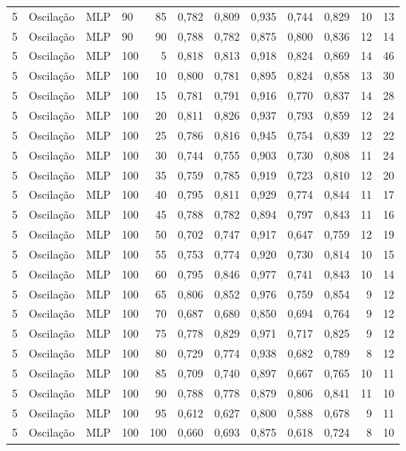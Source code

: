 \begin{longtable}{ccclrrrrrrrr}
5 & Oscilação & MLP & 90 & 85 & 0,782 & 0,809 & 0,935 & 0,744 & 0,829 & 10 & 13 \\
5 & Oscilação & MLP & 90 & 90 & 0,788 & 0,782 & 0,875 & 0,800 & 0,836 & 12 & 14 \\
5 & Oscilação & MLP & 100 & 5 & 0,818 & 0,813 & 0,918 & 0,824 & 0,869 & 14 & 46 \\
5 & Oscilação & MLP & 100 & 10 & 0,800 & 0,781 & 0,895 & 0,824 & 0,858 & 13 & 30 \\
5 & Oscilação & MLP & 100 & 15 & 0,781 & 0,791 & 0,916 & 0,770 & 0,837 & 14 & 28 \\
5 & Oscilação & MLP & 100 & 20 & 0,811 & 0,826 & 0,937 & 0,793 & 0,859 & 12 & 24 \\
5 & Oscilação & MLP & 100 & 25 & 0,786 & 0,816 & 0,945 & 0,754 & 0,839 & 12 & 22 \\
5 & Oscilação & MLP & 100 & 30 & 0,744 & 0,755 & 0,903 & 0,730 & 0,808 & 11 & 24 \\
5 & Oscilação & MLP & 100 & 35 & 0,759 & 0,785 & 0,919 & 0,723 & 0,810 & 12 & 20 \\
5 & Oscilação & MLP & 100 & 40 & 0,795 & 0,811 & 0,929 & 0,774 & 0,844 & 11 & 17 \\
5 & Oscilação & MLP & 100 & 45 & 0,788 & 0,782 & 0,894 & 0,797 & 0,843 & 11 & 16 \\
5 & Oscilação & MLP & 100 & 50 & 0,702 & 0,747 & 0,917 & 0,647 & 0,759 & 12 & 19 \\
5 & Oscilação & MLP & 100 & 55 & 0,753 & 0,774 & 0,920 & 0,730 & 0,814 & 10 & 15 \\
5 & Oscilação & MLP & 100 & 60 & 0,795 & 0,846 & 0,977 & 0,741 & 0,843 & 10 & 14 \\
5 & Oscilação & MLP & 100 & 65 & 0,806 & 0,852 & 0,976 & 0,759 & 0,854 & 9 & 12 \\
5 & Oscilação & MLP & 100 & 70 & 0,687 & 0,680 & 0,850 & 0,694 & 0,764 & 9 & 12 \\
5 & Oscilação & MLP & 100 & 75 & 0,778 & 0,829 & 0,971 & 0,717 & 0,825 & 9 & 12 \\
5 & Oscilação & MLP & 100 & 80 & 0,729 & 0,774 & 0,938 & 0,682 & 0,789 & 8 & 12 \\
5 & Oscilação & MLP & 100 & 85 & 0,709 & 0,740 & 0,897 & 0,667 & 0,765 & 10 & 11 \\
5 & Oscilação & MLP & 100 & 90 & 0,788 & 0,778 & 0,879 & 0,806 & 0,841 & 11 & 10 \\
5 & Oscilação & MLP & 100 & 95 & 0,612 & 0,627 & 0,800 & 0,588 & 0,678 & 9 & 11 \\
5 & Oscilação & MLP & 100 & 100 & 0,660 & 0,693 & 0,875 & 0,618 & 0,724 & 8 & 10 \\

\end{longtable}
